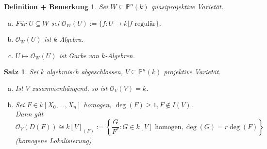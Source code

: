 \documentclass[a4paper,12pt]{report}
\theoremstyle{break}
\newtheorem{Satz}{Satz}
\newtheorem{DefBem}[Def]{Definition + Bemerkung}
\theoremstyle{nonumberbreak}
\theoremstyle{nonumberplain}
\newcommand{\IP}{\mathbb{P}}%
\newcommand{\calO}{\mathcal{O}}
\begin{document}
\begin{DefBem}
Sei $W\subseteq\IP^n(k)$ quasiprojektive Variet\"at.\begin{enumerate}[a)]
\item
	F\"ur $U\subseteq W$ sei $\calO_W(U):=\{f:U\to k\vert f \text{ regul\"ar}\}$.
\item
	$\calO_W(U)$ ist $k$-Algebra.
\item
	$U\mapsto\calO_W(U)$ ist Garbe von $k$-Algebren.
\end{enumerate}\end{DefBem}

\begin{Satz}\label{Satz7}
Sei $k$ algebraisch abgeschlossen, $V\subseteq\IP^n(k)$ projektive Variet\"at.\begin{enumerate}[a)]
\item
	Ist $V$ zusammenh\"angend, so ist $\calO_V(V)=k$.
\item
	Sei $F\in k[X_0,\ldots ,X_n]$ homogen, $\deg(F)\ge1, F\notin I(V)$.\\
	Dann gilt
	\[\calO_V(D(F))\cong k[V]_{(F)}:=\left\{\frac{G}{F^r}: G\in k[V] \text{ homogen}, \deg(G)=r\deg(F)\right\}\]
	(homogene Lokalisierung)
\end{enumerate}\end{Satz}
\end{document}
